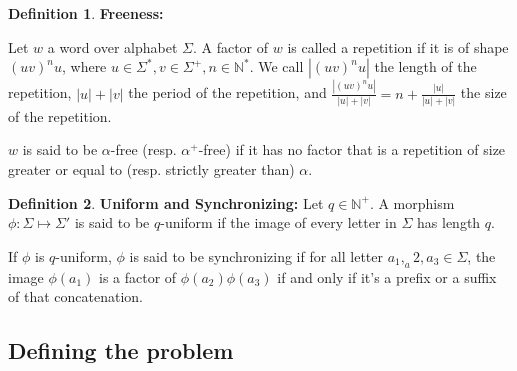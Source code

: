 \documentclass[a4paper]{article}
\newcommand{\N}{\mathbb{N}}
\newcommand{\oii}[1]{\todo[color=green!30,inline]{#1}}
\theoremstyle{definition}
\newtheorem{definition}{Definition}[section]
\begin{document}
\begin{definition}{\textbf{Freeness:}}

Let $w$ a word over alphabet $\Sigma$. A factor of $w$ is called a repetition if it is of shape $(uv)^nu$, where $u \in \Sigma^*, v \in \Sigma^+, n \in \N^*$. We call $|(uv)^nu|$ the length of the repetition, $|u|+|v|$ the period of the repetition, and $\frac{|(uv)^nu|}{|u|+|v|} = n + \frac{|u|}{|u| + |v|}$ the size of the repetition.

$w$ is said to be $\alpha$-free (resp. $\alpha^+$-free) if it has no factor that is a repetition of size greater or equal to (resp. strictly greater than) $\alpha$.



\end{definition}

\begin{definition}{\textbf{Uniform and Synchronizing:}}
Let $q\in \N^+$. A morphism $\phi : \Sigma \mapsto \Sigma'$ is said to be $q$-uniform if the image of every letter in $\Sigma$ has length $q$.

If $\phi$ is $q$-uniform, $\phi$ is said to be synchronizing if for all letter $a_1, _a2, a_3 \in \Sigma$, the image $\phi(a_1)$ is a factor of  $\phi(a_2)\phi(a_3)$ if and only if it's a prefix or a suffix of that concatenation.
\end{definition}

\subsection{Defining the problem}
\end{document}
